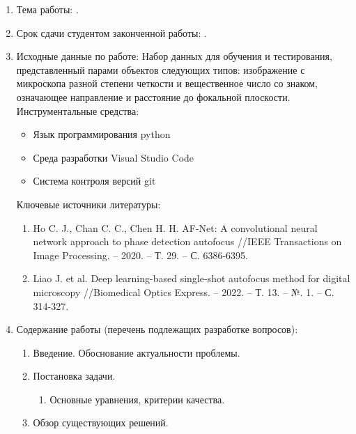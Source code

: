 \begin{enumerate}[1.]
	\item Тема работы: {\expandafter \thesisTitle.}
	\item Срок сдачи студентом законченной работы: \thesisDeadline. 
	\item Исходные данные по работе: Набор данных для обучения и тестирования, представленный парами объектов следующих типов: изображение с микроскопа разной степени четкости и вещественное число со знаком, означающее направление и расстояние до фокальной плоскости.\\%
	Инструментальные средства:
	\begin{itemize}
		\item Язык программирования python
		\item Среда разработки Visual Studio Code
		\item Система контроля версий git
	\end{itemize}
	Ключевые источники литературы:
	\begin{enumerate}
		\item Ho C. J., Chan C. C., Chen H. H. AF-Net: A convolutional neural network approach to phase detection autofocus //IEEE Transactions on Image Processing. – 2020. – Т. 29. – С. 6386-6395.
		\item Liao J. et al. Deep learning-based single-shot autofocus method for digital microscopy //Biomedical Optics Express. – 2022. – Т. 13. – №. 1. – С. 314-327.
	\end{enumerate}
	\item Содержание работы (перечень подлежащих разработке вопросов):
	\begin{enumerate}[label=\theenumi\arabic*.]
		\item Введение. Обоснование актуальности проблемы.
		\item Постановка задачи.
		\begin{enumerate}[label=\theenumii\arabic*.]
			\item Основные уравнения, критерии качества.
		\end{enumerate}
		\item Обзор существующих решений.
		\begin{enumerate}[label=\theenumii\arabic*.]

\end{enumerate}
\end{enumerate}
\end{enumerate}

